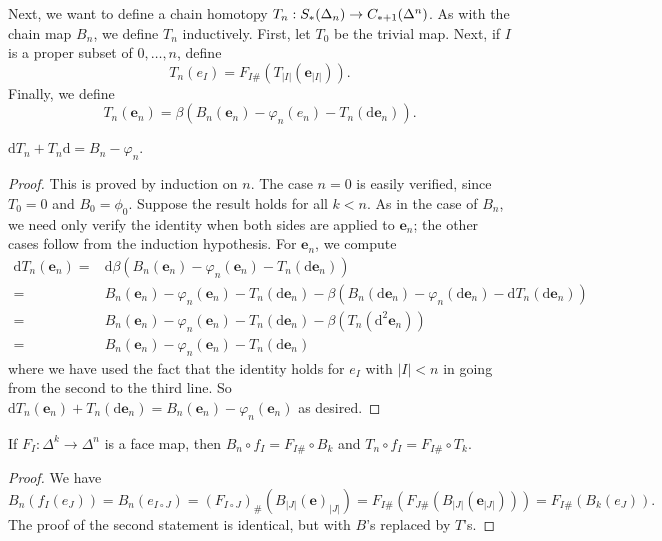 \documentclass[a4paper,11pt]{article}
\begin{document}
				Next, we want to define a chain homotopy $T_n:\sx{\Delta_n}\rightarrow \cx[\ast+1]{\Delta^n}$. As with the chain map $B_n$, we define $T_n$ inductively. First, let $T_0$ be the trivial map. Next, if $I$ is a proper subset of $0,\dots,n$, define
				\begin{equation*}
					T_n(e_I)=F_{I\#}(T_{|I|}(\textbf{e}_{|I|})).
				\end{equation*}
				Finally, we define 
				\begin{equation*}
					T_n(\textbf{e}_n)=\beta(B_n(\textbf{e}_n)-\varphi_n(e_n)-T_n(\mathrm{d}\textbf{e}_n)).
				\end{equation*}

				\begin{lemma}
					$\mathrm{d}T_n+T_n\mathrm{d}=B_n-\varphi_n$.
				\end{lemma}
				\begin{proof}
					This is proved by induction on $n$. The case $n=0$ is easily verified, since $T_0=0$ and $B_0=\phi_0$. Suppose the result holds for all $k<n$. As in the case of $B_n$, we need only verify the identity when both sides are applied to $\textbf{e}_n$; the other cases follow from the induction hypothesis. For $\textbf{e}_n$, we compute
					\begin{align*}
						\mathrm{d}T_n(\textbf{e}_n)=&\mathrm{d}\beta(B_n(\textbf{e}_n)-\varphi_n(\textbf{e}_n)-T_n(\mathrm{d}\textbf{e}_n))\\
						=&B_n(\textbf{e}_n)-\varphi_n(\textbf{e}_n)-T_n(\mathrm{d}\textbf{e}_n)-\beta(B_n(\mathrm{d}\textbf{e}_n)-\varphi_n(\mathrm{d}\textbf{e}_n)-\mathrm{d}T_n(\mathrm{d}\textbf{e}_n))\\
						=&B_n(\textbf{e}_n)-\varphi_n(\textbf{e}_n)-T_n(\mathrm{d}\textbf{e}_n)-\beta(T_n(\mathrm{d}^2\textbf{e}_n))\\
						=&B_n(\textbf{e}_n)-\varphi_n(\textbf{e}_n)-T_n(\mathrm{d}\textbf{e}_n)
					\end{align*}
					where we have used the fact that the identity holds for $e_I$ with $|I|<n$ in going from the second to the third line. So $\mathrm{d}T_n(\textbf{e}_n)+T_n(\mathrm{d}\textbf{e}_n)=B_n(\textbf{e}_n)-\varphi_n(\textbf{e}_n)$ as desired.
				\end{proof}

				\begin{lemma}\label{lem--naturality}
					If $F_I:\Delta^k\rightarrow \Delta^n$ is a face map, then $B_n\circ f_I=F_{I\#}\circ B_k$ and $T_n\circ f_I=F_{I\#}\circ T_k$.
				\end{lemma}
				\begin{proof}
					We have
					\begin{equation*}
						B_n(f_I(e_J))=B_n(e_{I\circ J})=(F_{I\circ J})_\#(B_{|J|}(\textbf{e})_{|J|})=F_{I\#}(F_{J\#}(B_{|J|}(\textbf{e}_{|J|})))=F_{I\#}(B_k(e_J)).
					\end{equation*}
					The proof of the second statement is identical, but with $B$'s replaced by $T$'s.
				\end{proof}
				
\end{document}
